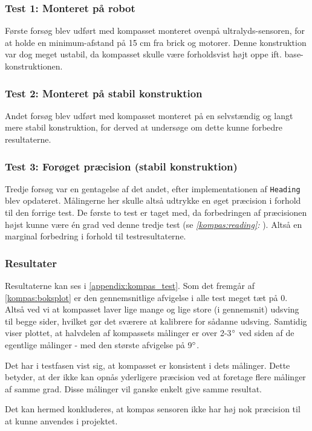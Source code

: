 

\subsubsection{Test 1: Monteret på robot}
Første forsøg blev udført med kompasset monteret ovenpå ultralyds-sensoren, for at holde en minimum-afstand på 15 cm fra brick og motorer.
Denne konstruktion var dog meget ustabil, da kompasset skulle være forholdsvist højt oppe ift. base-konstruktionen.

\subsubsection{Test 2: Monteret på stabil konstruktion}
Andet forsøg blev udført med kompasset monteret på en selvstændig og langt mere stabil konstruktion, for derved at undersøge om dette kunne forbedre resultaterne.

\subsubsection{Test 3: Forøget præcision (stabil konstruktion)}
Tredje forsøg var en gentagelse af det andet, efter implementationen af \lstinline[style=csharp]!Heading! blev opdateret.
Målingerne her skulle altså udtrykke en øget præcision i forhold til den forrige test.
De første to test er taget med, da forbedringen af præcisionen højst kunne være \'en grad ved denne tredje test (se \textit{\cref{kompas:reading}: }).
Altså en marginal forbedring i forhold til testresultaterne.

\subsubsection{Resultater}
Resultaterne kan ses i \cref{appendix:kompas_test}. Som det fremgår af \cref{kompas:boksplot} er den gennemsnitlige afvigelse i alle test meget tæt på 0.
Altså ved vi at kompasset laver lige mange og lige store (i gennemsnit) udsving til begge sider, hvilket gør det sværere at kalibrere for sådanne udsving.
Samtidig viser plottet, at halvdelen af kompassets målinger er over 2-3$^\circ$ ved siden af de egentlige målinger - med den største afvigelse på 9$^\circ$.

Det har i testfasen vist sig, at kompasset er konsistent i dets målinger.
Dette betyder, at der ikke kan opnås yderligere præcision ved at foretage flere målinger af samme grad.
Disse målinger vil ganske enkelt give samme resultat.

Det kan hermed konkluderes, at kompas sensoren ikke har høj nok præcision til at kunne anvendes i projektet.

